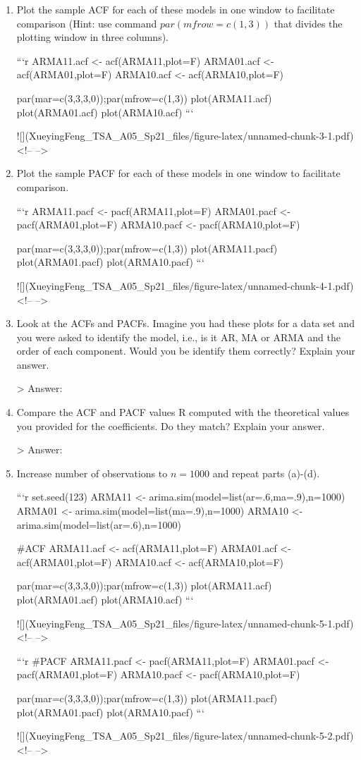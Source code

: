 \documentclass[
]{article}
\begin{document}
\begin{enumerate}[label=(\alph*)]

\item Plot the sample ACF for each of these models in one window to facilitate comparison (Hint: use command $par(mfrow=c(1,3))$ that divides the plotting window in three columns).  


```r
ARMA11.acf <- acf(ARMA11,plot=F)
ARMA01.acf <- acf(ARMA01,plot=F)
ARMA10.acf <- acf(ARMA10,plot=F)

par(mar=c(3,3,3,0));par(mfrow=c(1,3))
plot(ARMA11.acf)
plot(ARMA01.acf)
plot(ARMA10.acf)
```

![](XueyingFeng_TSA_A05_Sp21_files/figure-latex/unnamed-chunk-3-1.pdf)<!-- --> 


\item Plot the sample PACF for each of these models in one window to facilitate comparison.  


```r
ARMA11.pacf <- pacf(ARMA11,plot=F)
ARMA01.pacf <- pacf(ARMA01,plot=F)
ARMA10.pacf <- pacf(ARMA10,plot=F)

par(mar=c(3,3,3,0));par(mfrow=c(1,3))
plot(ARMA11.pacf)
plot(ARMA01.pacf)
plot(ARMA10.pacf)
```

![](XueyingFeng_TSA_A05_Sp21_files/figure-latex/unnamed-chunk-4-1.pdf)<!-- --> 

\item Look at the ACFs and PACFs. Imagine you had these plots for a data set and you were asked to identify the model, i.e., is it AR, MA or ARMA and the order of each component. Would you be identify them correctly? Explain your answer.

> Answer:

\item Compare the ACF and PACF values R computed with the theoretical values you provided for the coefficients. Do they match? Explain your answer.

> Answer: 


\item Increase number of observations to $n=1000$ and repeat parts (a)-(d).


```r
set.seed(123)
ARMA11 <- arima.sim(model=list(ar=.6,ma=.9),n=1000)
ARMA01 <- arima.sim(model=list(ma=.9),n=1000)
ARMA10 <- arima.sim(model=list(ar=.6),n=1000)

#ACF
ARMA11.acf <- acf(ARMA11,plot=F)
ARMA01.acf <- acf(ARMA01,plot=F)
ARMA10.acf <- acf(ARMA10,plot=F)

par(mar=c(3,3,3,0));par(mfrow=c(1,3))
plot(ARMA11.acf)
plot(ARMA01.acf)
plot(ARMA10.acf)
```

![](XueyingFeng_TSA_A05_Sp21_files/figure-latex/unnamed-chunk-5-1.pdf)<!-- --> 

```r
#PACF
ARMA11.pacf <- pacf(ARMA11,plot=F)
ARMA01.pacf <- pacf(ARMA01,plot=F)
ARMA10.pacf <- pacf(ARMA10,plot=F)

par(mar=c(3,3,3,0));par(mfrow=c(1,3))
plot(ARMA11.pacf)
plot(ARMA01.pacf)
plot(ARMA10.pacf)
```

![](XueyingFeng_TSA_A05_Sp21_files/figure-latex/unnamed-chunk-5-2.pdf)<!-- --> 

\end{enumerate}
\end{document}

